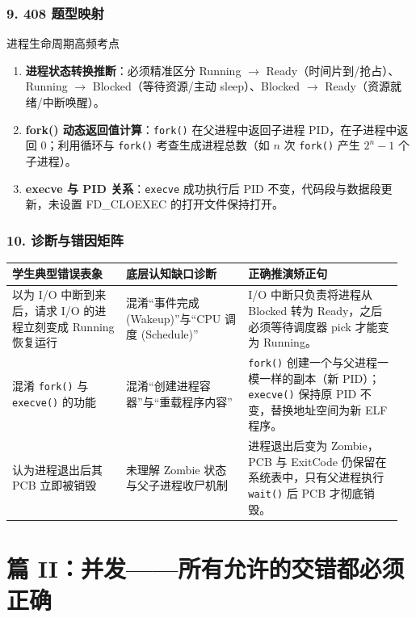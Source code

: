 \documentclass[11pt,a4paper,openany]{ctexbook}
\begin{document}
\subsubsection*{9. 408 题型映射}
\begin{examBox}{进程生命周期高频考点}
\begin{enumerate}
  \item \textbf{进程状态转换推断}：必须精准区分 Running $\rightarrow$ Ready（时间片到/抢占）、Running $\rightarrow$ Blocked（等待资源/主动 sleep）、Blocked $\rightarrow$ Ready（资源就绪/中断唤醒）。
  \item \textbf{fork() 动态返回值计算}：\texttt{fork()} 在父进程中返回子进程 PID，在子进程中返回 0；利用循环与 \texttt{fork()} 考查生成进程总数（如 $n$ 次 \texttt{fork()} 产生 $2^n-1$ 个子进程）。
  \item \textbf{execve 与 PID 关系}：\texttt{execve} 成功执行后 PID 不变，代码段与数据段更新，未设置 FD\_CLOEXEC 的打开文件保持打开。
\end{enumerate}
\end{examBox}

\subsubsection*{10. 诊断与错因矩阵}
\begingroup
\small
\setlength{\tabcolsep}{3pt}
\begin{longtable}{p{0.28\linewidth}p{0.30\linewidth}p{0.38\linewidth}}
\toprule
\textbf{学生典型错误表象} & \textbf{底层认知缺口诊断} & \textbf{正确推演矫正句} \\
\midrule
以为 I/O 中断到来后，请求 I/O 的进程立刻变成 Running 恢复运行 & 混淆“事件完成 (Wakeup)”与“CPU 调度 (Schedule)” & I/O 中断只负责将进程从 Blocked 转为 Ready，之后必须等待调度器 pick 才能变为 Running。 \\
\midrule
混淆 \texttt{fork()} 与 \texttt{execve()} 的功能 & 混淆“创建进程容器”与“重载程序内容” & \texttt{fork()} 创建一个与父进程一模一样的副本（新 PID）；\texttt{execve()} 保持原 PID 不变，替换地址空间为新 ELF 程序。 \\
\midrule
认为进程退出后其 PCB 立即被销毁 & 未理解 Zombie 状态与父子进程收尸机制 & 进程退出后变为 Zombie，PCB 与 ExitCode 仍保留在系统表中，只有父进程执行 \texttt{wait()} 后 PCB 才彻底销毁。 \\
\bottomrule
\end{longtable}
\endgroup



\section{篇 II：并发——所有允许的交错都必须正确}
\end{document}
